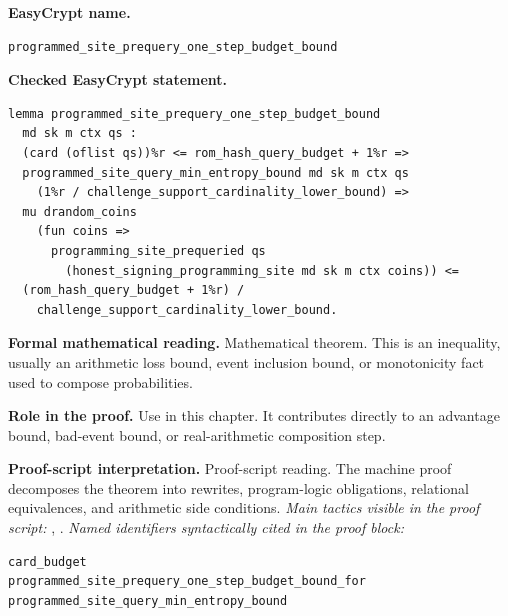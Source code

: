 \begin{formaltheorem}
\noindent\textbf{EasyCrypt name.}
\begin{lstlisting}[language=EasyCrypt,basicstyle=\ttfamily\scriptsize]
programmed_site_prequery_one_step_budget_bound
\end{lstlisting}
\noindent\textbf{Checked EasyCrypt statement.}
\begin{lstlisting}[language=EasyCrypt,basicstyle=\ttfamily\scriptsize]
lemma programmed_site_prequery_one_step_budget_bound
  md sk m ctx qs :
  (card (oflist qs))%r <= rom_hash_query_budget + 1%r =>
  programmed_site_query_min_entropy_bound md sk m ctx qs
    (1%r / challenge_support_cardinality_lower_bound) =>
  mu drandom_coins
    (fun coins =>
      programming_site_prequeried qs
        (honest_signing_programming_site md sk m ctx coins)) <=
  (rom_hash_query_budget + 1%r) /
    challenge_support_cardinality_lower_bound.
\end{lstlisting}
\noindent\textbf{Formal mathematical reading.}
Mathematical theorem. This is an inequality, usually an arithmetic loss bound, event inclusion bound, or monotonicity fact used to compose probabilities.

\noindent\textbf{Role in the proof.}
Use in this chapter. It contributes directly to an advantage bound, bad-event bound, or real-arithmetic composition step.

\noindent\textbf{Proof-script interpretation.}
Proof-script reading. The machine proof decomposes the theorem into rewrites, program-logic obligations, relational equivalences, and arithmetic side conditions.
\emph{Main tactics visible in the proof script:} , .
\emph{Named identifiers syntactically cited in the proof block:}
\begin{lstlisting}[language=EasyCrypt,basicstyle=\ttfamily\scriptsize]
card_budget
programmed_site_prequery_one_step_budget_bound_for
programmed_site_query_min_entropy_bound
\end{lstlisting}

\end{formaltheorem}

